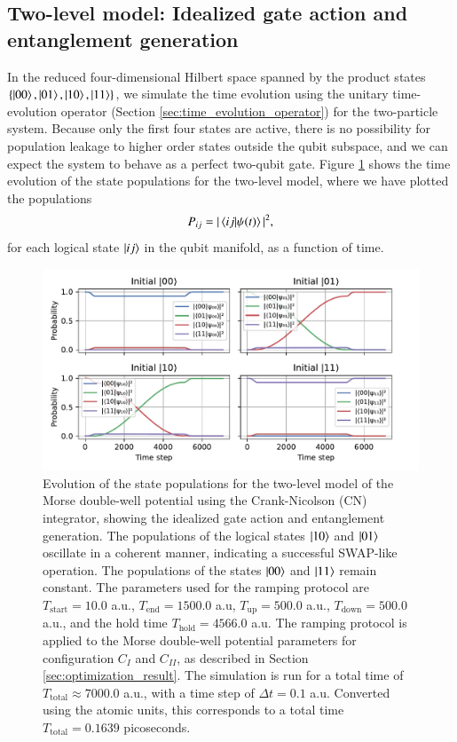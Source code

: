 \documentclass{subfiles}
\begin{document}
\subsection{Two-level model: Idealized gate action and entanglement generation}
In the reduced four-dimensional Hilbert space spanned by the product states $\{\ket{00}, \ket{01}, \ket{10}, \ket{11}\}$, we simulate the time evolution using the unitary time-evolution operator (Section \ref{sec:time_evolution_operator}) for the two-particle system. Because only the first four states are active, there is no possibility for population leakage to higher order states outside the qubit subspace, and we can expect the system to behave as a perfect two-qubit gate. Figure \ref{fig:time_evolution_2_basefunctions} shows the time evolution of the state populations for the two-level model, where we have plotted the populations 
\begin{align*}
    P_{ij} = |\braket{ij| \psi(t)}|^2,
\end{align*}
for each logical state $\ket{ij}$ in the qubit manifold, as a function of time.
\begin{figure}[h!]
    \centering
    \includegraphics[width=1.0\textwidth]{figs/time_evolution_2_basefunctions_2506_SWAP.pdf}
    \caption{Evolution of the state populations for the two-level model of the Morse double-well potential using the Crank-Nicolson (CN) integrator, showing the idealized gate action and entanglement generation. The populations of the logical states $\ket{10}$ and $\ket{01}$ oscillate in a coherent manner, indicating a successful SWAP-like operation. The populations of the states $\ket{00}$ and $\ket{11}$ remain constant. The parameters used for the ramping protocol are $T_{\text{start}} = 10.0$ a.u., $T_{\text{end}} = 1500.0$ a.u, $T_{\text{up}} = 500.0$ a.u., $T_{\text{down}} = 500.0$ a.u., and the hold time $T_{\text{hold}} = 4566.0$ a.u. The ramping protocol is applied to the Morse double-well potential parameters for configuration $C_I$ and $C_{II}$, as described in Section \ref{sec:optimization_result}. The simulation is run for a total time of $T_{\text{total}} \approx 7000.0$ a.u., with a time step of $\Delta t = 0.1$ a.u. Converted using the atomic units, this corresponds to a total time $T_{\text{total}}=0.1639$ picoseconds.}
    \label{fig:time_evolution_2_basefunctions}
\end{figure}
\end{document}
